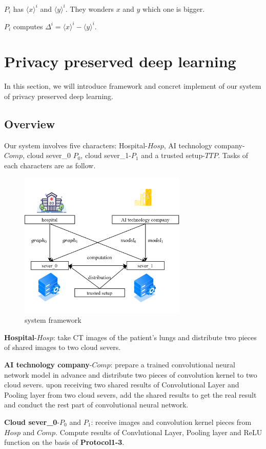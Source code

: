 \documentclass[11pt,twoside,a4paper]{article}
\begin{document}
$P_{i}$ has $\langle x\rangle ^{i}$ and $\langle y\rangle ^{i}$.
They wonders $x$ and $y$ which one is bigger.

$P_{i}$ computes $\Delta^{i}=\langle x\rangle ^{i}-\langle y\rangle ^{i}$.


\section{Privacy preserved deep learning}
In this section, we will introduce framework and concret implement of our system of privacy preserved deep learning. 

\subsection{Overview}
Our system involves five characters: Hospital-$Hosp$, AI technology company-$Comp$, cloud sever\_0 $P_{0}$, cloud sever\_1-$P_{1}$ and a trusted setup-$TTP$. Tasks of each characters are as follow.

\begin{figure}[htbp]
	\includegraphics[width=8cm]{framework.png}
	\caption{system framework}
\end{figure}


\textbf{Hospital}-$Hosp$: take CT images of the patient's lungs and distribute two pieces of shared images to two cloud severs.

\textbf{AI technology company}-$Comp$: prepare a trained convolutional neural network model in advance and distribute two pieces of convolution kernel to two cloud severs. 
upon receiving two shared results of Convolutional Layer and Pooling layer from two cloud severs, 
add the shared results to get the real result and conduct the rest part of convolutional neural network.
 
\textbf{Cloud sever\_0}-$P_{0}$ and $P_{1}$: receive images and convolution kernel pieces from $Hosp$ and $Comp$. 
Compute results of Convlutional Layer, Pooling layer and ReLU function on the basis of \textbf{Protocol1-3}.
\end{document}
